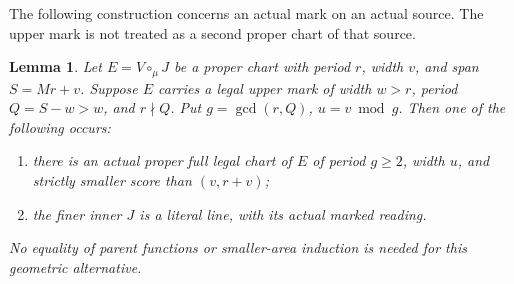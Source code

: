 \documentclass[11pt,a4paper]{amsart}
\numberwithin{equation}{section}
\theoremstyle{plain}
\newtheorem{lemma}[theorem]{Lemma}
\theoremstyle{definition}
\begin{document}
The following construction concerns an actual mark on an actual source.  The upper mark is not treated as a second proper chart of that source.
\begin{lemma}\label{rt:wide}
Let \(E=V\circ_\mu J\) be a proper chart with period \(r\), width \(v\), and span \(S=Mr+v\).  Suppose \(E\) carries a legal upper mark of width \(w>r\), period \(Q=S-w>w\), and \(r\nmid Q\).  Put \(g=\gcd(r,Q)\), \(u=v\bmod g\).  Then one of the following occurs:
\begin{enumerate}
\item there is an actual proper full legal chart of \(E\) of period \(g\ge2\), width \(u\), and strictly smaller score than \((v,r+v)\);
\item the finer inner \(J\) is a literal line, with its actual marked reading.
\end{enumerate}
No equality of parent functions or smaller-area induction is needed for this geometric alternative.
\end{lemma}
\end{document}
